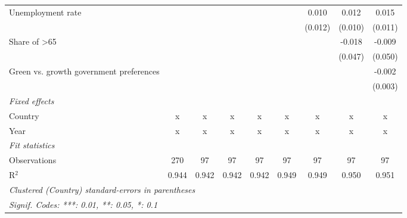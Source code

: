 \begin{table}[htbp]
\begin{tabular}{lcccccccc}
      Unemployment rate                           &         &              &         &         &              & 0.010        & 0.012        & 0.015\\   
                                                  &         &              &         &         &              & (0.012)      & (0.010)      & (0.011)\\   
      Share of >65                                &         &              &         &         &              &              & -0.018       & -0.009\\   
                                                  &         &              &         &         &              &              & (0.047)      & (0.050)\\   
      Green vs. growth government preferences     &         &              &         &         &              &              &              & -0.002\\   
                                                  &         &              &         &         &              &              &              & (0.003)\\   
      \emph{Fixed effects}\\
      Country                                     & x       & x            & x       & x       & x            & x            & x            & x\\  
      Year                                        & x       & x            & x       & x       & x            & x            & x            & x\\  
      \midrule \emph{Fit statistics}\\
      Observations                                & 270     & 97           & 97      & 97      & 97           & 97           & 97           & 97\\  
      R$^2$                                       & 0.944   & 0.942        & 0.942   & 0.942   & 0.949        & 0.949        & 0.950        & 0.951\\  
      \midrule
      \multicolumn{9}{l}{\emph{Clustered (Country) standard-errors in parentheses}}\\
      \multicolumn{9}{l}{\emph{Signif. Codes: ***: 0.01, **: 0.05, *: 0.1}}\\
   \end{tabular}
\end{table}



